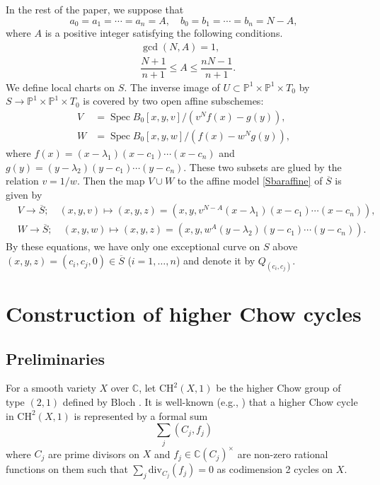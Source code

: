 \documentclass[letterpaper, 11pt]{amsart}
\theoremstyle{my theoremstyle}
\theoremstyle{dfn}
\theoremstyle{remark}
\renewcommand{\1}{\mathbbm{1}}
\newcommand{\C}{\mathbb{C}}
\renewcommand{\P}{\mathbb{P}}
\renewcommand{\l}{\lambda}
\newcommand{\spec}{\operatorname{Spec}}
\numberwithin{equation}{section}
\begin{document}
In the rest of the paper, we suppose that $$
a_0=a_1= \cdots =a_n=A, \quad b_0=b_1= \cdots =b_n= N-A,  
$$ where $A$ is a positive integer satisfying the following conditions.
\begin{align}
&\gcd(N, A)=1, \\ 
&\dfrac{N+1}{n+1} \leq A \leq \dfrac{nN-1}{n+1}. \label{rangeassumption}
\end{align}
We define local charts on $S$. 
The inverse image of $U\subset \P^1\times \P^1\times T_0$ by $S \to \P^1 \times \P^1 \times T_0$ is covered by two open affine subschemes: 
\begin{align*}
V&=\spec B_0[x, y, v]/(v^Nf(x) -g(y)),  \\
W&=\spec B_0[x, y, w]/(f(x) - w^Ng(y)),  
\end{align*}
where $f(x)=(x-\l_1)(x-c_1) \cdots (x-c_n)$ and $g(y)=(y-\l_2)(y-c_1) \cdots (y-c_n)$.  
These two subsets are glued by the relation $v=1/w$. 
Then the map $V \cup W$ to the affine model \eqref{Sbaraffine} of $\overline{S}$ is given by 
\begin{align*}
& V \to \overline{S}; \quad (x, y, v) \mapsto (x, y, z)=(x, y, v^{N-A} (x-\l_1)(x-c_1) \cdots (x-c_n)),  \\ 
& W \to \overline{S}; \quad (x, y, w) \mapsto (x, y, z)=(x, y, w^A (y-\l_2) (y-c_1) \cdots (y-c_n)).   
\end{align*}
By these equations, we have only one exceptional curve on $S$ above $(x, y,z)=(c_i, c_j,0)\in \overline{S}$ ($i=1, \ldots, n$) and denote it by $Q_{(c_i, c_j)}$.

\section{Construction of higher Chow cycles} \label{ConstChow}
\subsection{Preliminaries}
For a smooth variety $X$ over $\C$, let $\mathrm{CH}^2(X,1)$ be the higher Chow group of type $(2,1)$ defined by Bloch \cite{Bloch}.
It is well-known (e.g., \cite[Corollary 5.3]{MS2}) that a higher Chow cycle in $\mathrm{CH}^2(X,1)$ is represented by a formal sum
\begin{equation}\label{formalsum}
\sum_j (C_j, f_j)
\end{equation}
where $C_j$ are prime divisors on $X$ and $f_j\in \C(C_j)^\times$ are non-zero rational functions on them such that $\sum_j {\mathrm{div}}_{C_j}(f_j) = 0$ as codimension 2 cycles on $X$.
\end{document}
